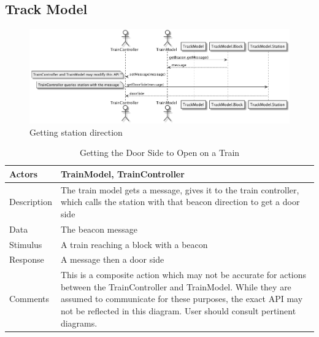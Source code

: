 \documentclass[]{article}
\begin{document}
\subsection{Track Model}
\begin{figure}[H]
	\centering
	\includegraphics[width=\textwidth]{getStationDirection.png}
	\caption{Getting station direction}
\end{figure}
\begin{table}[H]
	\centering
	\caption{Getting the Door Side to Open on a Train}
	\begin{tabular}{|l|l|}
		\hline
		Actors & \parbox[t]{10cm}{TrainModel, TrainController} \\ \hline
		Description & \parbox[t]{10cm}{The train model gets a message, gives it to the train controller, which calls the station with that beacon direction to get a door side} \\ \hline
		Data &  \parbox[t]{10cm}{The beacon message} \\ \hline
		Stimulus &  \parbox[t]{10cm}{A train reaching a block with a beacon} \\ \hline
		Response & \parbox[t]{10cm}{A message then a door side}\\ \hline
		Comments & \parbox[t]{10cm}{This is a composite action which may not be accurate for actions between the TrainController and TrainModel. While they are assumed to communicate for these purposes, the exact API may not be reflected in this diagram. User should consult pertinent diagrams.}  \\ \hline
	\end{tabular}
\end{table}
\end{document}
